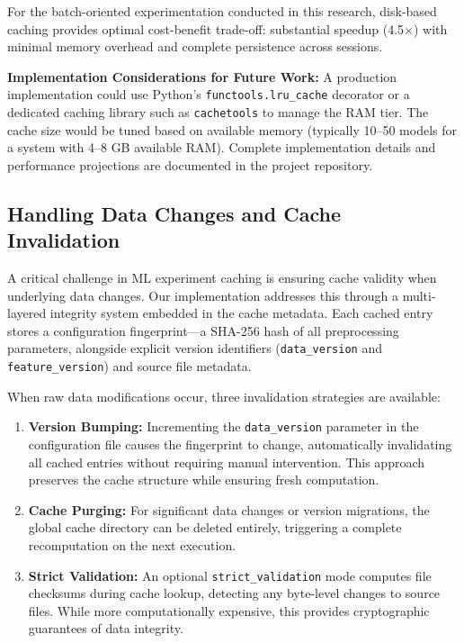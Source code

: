 \documentclass{imc-inf} %
\begin{document}
For the batch-oriented experimentation conducted in this research, disk-based 
caching provides optimal cost-benefit trade-off: substantial speedup (4.5$\times$) 
with minimal memory overhead and complete persistence across sessions.

\textbf{Implementation Considerations for Future Work:}
A production implementation could use Python's \verb|functools.lru_cache| decorator 
or a dedicated caching library such as \verb|cachetools| to manage the RAM tier. 
The cache size would be tuned based on available memory (typically 10--50 models 
for a system with 4--8 GB available RAM). Complete implementation details and 
performance projections are documented in the project repository.

\subsection{Handling Data Changes and Cache Invalidation}

A critical challenge in ML experiment caching is ensuring cache validity when underlying data changes. Our implementation addresses this through a multi-layered integrity system embedded in the cache metadata. Each cached entry stores a configuration fingerprint---a SHA-256 hash of all preprocessing parameters, alongside explicit version identifiers (\texttt{data\_version} and \texttt{feature\_version}) and source file metadata.

When raw data modifications occur, three invalidation strategies are available:

\begin{enumerate}
\item \textbf{Version Bumping:} Incrementing the \texttt{data\_version} parameter in the configuration file causes the fingerprint to change, automatically invalidating all cached entries without requiring manual intervention. This approach preserves the cache structure while ensuring fresh computation.

\item \textbf{Cache Purging:} For significant data changes or version migrations, the global cache directory can be deleted entirely, triggering a complete recomputation on the next execution.

\item \textbf{Strict Validation:} An optional \texttt{strict\_validation} mode computes file checksums during cache lookup, detecting any byte-level changes to source files. While more computationally expensive, this provides cryptographic guarantees of data integrity.
\end{enumerate}
\end{document}
